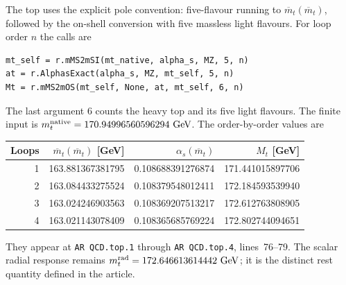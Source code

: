 \documentclass[aps,prx,onecolumn,10pt,notitlepage,nofootinbib,longbibliography]{revtex4-2}
\numberwithin{equation}{section}
\numberwithin{table}{section}
\begin{document}
The top uses the explicit pole convention: five-flavour running to
$\overline m_t(\overline m_t)$, followed by the on-shell conversion with five
massless light flavours. For loop order $n$ the calls are
\begin{verbatim}
mt_self = r.mMS2mSI(mt_native, alpha_s, MZ, 5, n)
at = r.AlphasExact(alpha_s, MZ, mt_self, 5, n)
Mt = r.mMS2mOS(mt_self, None, at, mt_self, 6, n)
\end{verbatim}
The last argument $6$ counts the heavy top and its five light flavours.
The finite input is $m_t^{\rm native}=170.94996560596294\ \mathrm{GeV}$.
The order-by-order values are
\begin{center}\small
\begin{tabular}{rrrr}
\toprule
Loops&$\overline m_t(\overline m_t)$ [GeV]&$\alpha_s(\overline m_t)$&$M_t$ [GeV]\\
\midrule
1&163.881367381795&0.108688391276874&171.441015897706\\
2&163.084433275524&0.108379548012411&172.184593539940\\
3&163.024246903563&0.108369207513217&172.612763808905\\
4&163.021143078409&0.108365685769224&172.802744094651\\
\bottomrule
\end{tabular}
\end{center}
They appear at \texttt{AR QCD.top.1} through \texttt{AR QCD.top.4},
lines~76--79. The scalar radial response remains
$m_t^{\rm rad}=172.646613614442\ \mathrm{GeV}$; it is the distinct rest
quantity defined in the article.
\end{document}
